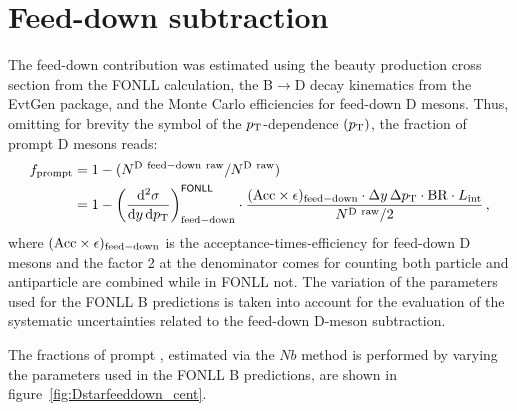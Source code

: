 \section{Feed-down subtraction}

The feed-down contribution was estimated using 
the beauty production cross section from the FONLL calculation,
the B$\rightarrow$D decay kinematics from the EvtGen package,
and the Monte Carlo efficiencies for feed-down D mesons. 
Thus, omitting for brevity the symbol of the $p_{\rm T}$-dependence $(p_{\rm T})$, 
the fraction of prompt D mesons reads:
\begin{equation}
 \label{eq:fcNbMethod}
 \begin{split}
   f_{\rm prompt} &= 1-(N^{\rm D~feed-down~raw}/N^{\rm D~raw})\\
   &= 1 -  \left( \frac{{\rm d}^2 \sigma}{{\rm d}y \, {\rm d}p_{\rm T} }
\right)^{{\sf FONLL}} _{{\rm feed-down}} \cdot
\frac{({\rm Acc}\times\epsilon)_{\rm feed-down}\cdot\Delta y \, \Delta p_{\rm T}
\cdot {\rm BR} \cdot L_{\rm int}  }{ N^{\rm D~raw }  / 2} \, ,
 \end{split}
\end{equation}
where $({\rm Acc}\times\epsilon)_{{\rm feed-down}}$ is the 
acceptance-times-efficiency for feed-down D mesons and the factor 2 at the denominator
comes for counting both particle and antiparticle
are combined while in FONLL not. The variation of the parameters used for the FONLL B predictions is taken into account for the evaluation of the systematic uncertainties related to the feed-down D-meson subtraction.

The fractions of prompt \Dstar , estimated via the $Nb$ method is performed by varying the parameters used in the FONLL B predictions, are shown in figure~\ref{fig:Dstarfeeddown_cent}.


